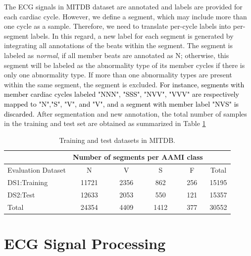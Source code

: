 The ECG signals in MITDB dataset are annotated and labels are provided for each cardiac cycle. However, we define a segment, which may include more than one cycle as a sample. Therefore, we need to translate per-cycle labels into per-segment labels. In this regard, a new label for each segment is generated by integrating all annotations of the beats within the segment. The segment is labeled as \textit{normal}, if all member beats are annotated as N; otherwise, this segment will be labeled as the abnormality type of its member cycles if there is only one abnormality type. If more than one abnormality types are present within the same segment, the segment is excluded. \textcolor{black}{For instance, segments with member cardiac cycles labeled "NNN", "SSS", "NVV", "VVV" are respectively mapped to "N","S", "V", and "V", and a segment with member label "NVS" is discarded.} 
After segmentation and new annotation, the total number of samples in the training and test set are obtained as summarized in Table \ref{table:ds}
\begin{table}[t]
	\centering
	\caption{Training and test datasets in MITDB.}
	\vspace{-0.05in}
	\begin{tabular}{|l||c|c|c|c|c|}
		\hline 
		& \multicolumn{4}{c}{Number of segments per AAMI class} &\\ 
		\hline 
		Evaluation Dataset& N & V & S & F &Total \\ 
		\hline 
		DS1:Training & 11721& 2356 & 862 & 256 & 15195\\ 
		\hline 
		DS2:Test & 12633 & 2053 & 550 & 121 & 15357 \\ 
		\hline 
		Total & 24354 & 4409 & 1412 & 377 & 30552 \\ 
		\hline 
	\end{tabular}
	\label{table:ds} 
	\vspace{-0.15in}
\end{table}

\section{ECG Signal Processing}

